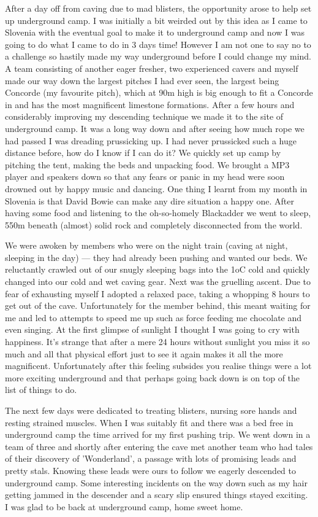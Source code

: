 After a day off from caving due to mad blisters, the opportunity arose to help
set up underground camp. I was initially a bit weirded out by this idea as I
came to Slovenia with the eventual goal to make it to underground camp and now
I was going to do what I came to do in 3 days time! However I am not one to say
no to a challenge so hastily made my way underground before I could change my
mind. A team consisting of another eager fresher, two experienced cavers and
myself made our way down the largest pitches I had ever seen, the largest being
Concorde (my favourite pitch), which at 90m high is big enough to fit a
Concorde in and has the most magnificent limestone formations. After a few
hours and considerably improving my descending technique we made it to the site
of underground camp. It was a long way down and after seeing how much rope we
had passed I was dreading prussicking up. I had never prussicked such a huge
distance before, how do I know if I can do it? We quickly set up camp by
pitching the tent, making the beds and unpacking food. We brought a MP3 player
and speakers down so that any fears or panic in my head were soon drowned out
by happy music and dancing. One thing I learnt from my month in Slovenia is
that David Bowie can make any dire situation a happy one. After having some
food and listening to the oh-so-homely Blackadder we went to sleep, 550m
beneath (almost) solid rock and completely disconnected from the world.

We were awoken by members who were on the night train (caving at night,
sleeping in the day) --- they had already been pushing and wanted our beds. We
reluctantly crawled out of our snugly sleeping bags into the 1oC cold and
quickly changed into our cold and wet caving gear. Next was the gruelling
ascent. Due to fear of exhausting myself I adopted a relaxed pace, taking a
whopping 8 hours to get out of the cave. Unfortunately for the member behind,
this meant waiting for me and led to attempts to speed me up such as force
feeding me chocolate and even singing. At the first glimpse of sunlight I
thought I was going to cry with happiness. It's strange that after a mere 24
hours without sunlight you miss it so much and all that physical effort just to
see it again makes it all the more magnificent. Unfortunately after this
feeling subsides you realise things were a lot more exciting underground and
that perhaps going back down is on top of the list of things to do.

The next few days were dedicated to treating blisters, nursing sore hands and
resting strained muscles. When I was suitably fit and there was a bed free in
underground camp the time arrived for my first pushing trip. We went down in a
team of three and shortly after entering the cave met another team who had
tales of their discovery of 'Wonderland', a passage with lots of promising
leads and pretty stals. Knowing these leads were ours to follow we eagerly
descended to underground camp. Some interesting incidents on the way down such
as my hair getting jammed in the descender and a scary slip ensured things
stayed exciting. I was glad to be back at underground camp, home sweet home.


